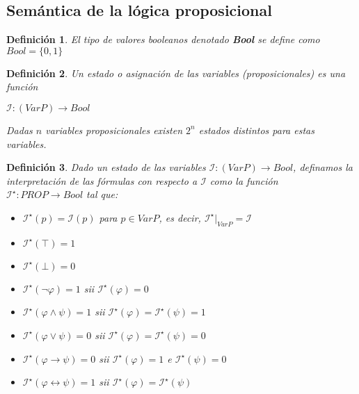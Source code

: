 \documentclass[letterpaper,12pt]{article}
\newtheorem{define}{Definición}[]
\begin{document}
    \subsection{Semántica de la lógica proposicional}
    \begin{define} 
        El tipo de valores booleanos denotado \textbf{Bool} se define
        como $Bool = \{0, 1 \}$
    \end{define}
    \begin{define}
        Un estado o asignación de las variables (proposicionales) es una 
        función 
        \begin{center}
            $\mathcal{I} : (Var P) \rightarrow Bool$
        \end{center}
        Dadas $n$ variables proposicionales existen $2^{n}$ estados 
        distintos para estas variables.
    \end{define}
    \begin{define}
        Dado un estado de las variables 
        $\mathcal{I} : (Var P) \rightarrow Bool$, definamos la interpretación
        de las fórmulas con respecto a $\mathcal{I}$ como la función 
        $\mathcal{I^{\star}} : PROP \rightarrow Bool$ tal que: 
        \begin{itemize}
            \item $\mathcal{I^{\star}}(p) = \mathcal{I}(p)$ para 
            $p \in Var P$, es decir, 
            $\mathcal{I^{\star}}|_{Var P} = \mathcal{I}$
            \item $\mathcal{I^{\star}}(\top) = 1$
            \item $\mathcal{I^{\star}}(\bot) = 0$
            \item $\mathcal{I^{\star}}(\neg \varphi) = 1$ sii 
            $\mathcal{I^{\star}}(\varphi) = 0$
            \item $\mathcal{I^{\star}}(\varphi \land \psi) = 1$
            sii $\mathcal{I^{\star}}(\varphi) = \mathcal{I^{\star}}(\psi) = 1$
            \item $\mathcal{I^{\star}}(\varphi \lor \psi) = 0$
            sii $\mathcal{I^{\star}}(\varphi) = 
            \mathcal{I^{\star}}(\psi) = 0$
            \item $\mathcal{I^{\star}}(\varphi \rightarrow \psi) = 0$
            sii $\mathcal{I^{\star}}(\varphi) = 1$ e
            $\mathcal{I^{\star}}(\psi) = 0$
            \item $\mathcal{I^{\star}}(\varphi \leftrightarrow \psi) = 1$
            sii $\mathcal{I^{\star}}(\varphi) = \mathcal{I^{\star}}(\psi)$
        \end{itemize}
    \end{define}
\end{document}
